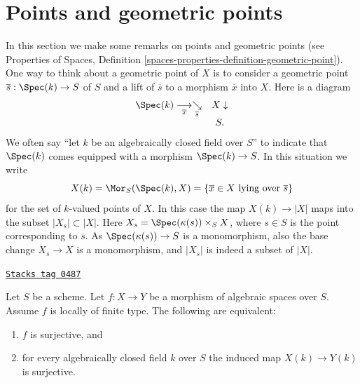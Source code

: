 \section{Points and geometric points}
\label{spaces-morphisms-section-points-fields}
In this section we make some remarks on points and geometric points (see
Properties of Spaces,
Definition \ref{spaces-properties-definition-geometric-point}).
One way to think about a geometric point of $X$ is to
consider a geometric point $\overline{s} : \Spec(k) \to S$ of $S$
and a lift of $\overline{s}$ to a morphism $\overline{x}$ into $X$.
Here is a diagram
$$
\begin{array}{cc}\Spec(k) \underset{\overline{x}}{\longrightarrow}\underset{\overline{s}}{\searrow} & X \downarrow \\  & S.\end{array}
$$
We often say ``let $k$ be an algebraically closed field over $S$''
to indicate that $\Spec(k)$ comes equipped with a morphism
$\Spec(k) \to S$. In this situation we write
$$
X(k) = \Mor_S(\Spec(k), X) =
\{\overline{x} \in X\text{ lying over }\overline{s}\}
$$
for the set of $k$-valued points of $X$. In this case the map
$X(k) \to |X|$ maps into the subset $|X_s| \subset |X|$.
Here $X_s = \Spec(\kappa(s)) \times_S X$, where $s \in S$
is the point corresponding to $\overline{s}$. As
$\Spec(\kappa(s)) \to S$ is a monomorphism, also the base change
$X_s \to X$ is a monomorphism, and $|X_s|$ is indeed a subset of $|X|$.

\begin{lemma}
\label{spaces-morphisms-lemma-locally-finite-type-surjective-geometric-points}
\href{https://stacks.math.columbia.edu/tag/0487}{\texttt{Stacks tag 0487}}

Let $S$ be a scheme. Let $f : X \to Y$ be a morphism of algebraic spaces
over $S$. Assume $f$ is locally of finite type. The following are equivalent:
\begin{enumerate}
\item $f$ is surjective, and
\item for every algebraically closed field $k$ over $S$ the induced
map $X(k) \to Y(k)$ is surjective.
\end{enumerate}
\end{lemma}

